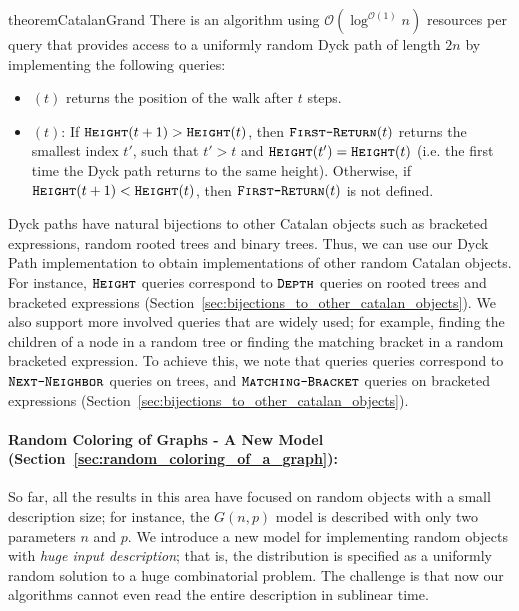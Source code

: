 \begin{restatable}{theorem}{CatalanGrand}
\label{thm:catalan_main}
There is an algorithm using $\mathcal O(\log^{\mathcal O(1)} n)$ resources per query that provides access to
a uniformly random Dyck path of length $2n$ by implementing the following queries:
\begin{itemize}
    \item {}$(t)$ returns the position of the walk after $t$ steps.
    \item {}$(t)$: If $\texttt{\textsc{Height}}(t+1) > \texttt{\textsc{Height}}(t)$, then $\texttt{\textsc{First-Return}}(t)$ returns the smallest index $t'$,
    such that $t'>t$ and $\texttt{\textsc{Height}}(t') = \texttt{\textsc{Height}}(t)$ (i.e. the first time the Dyck path returns to the same height).
    Otherwise, if $\texttt{\textsc{Height}}(t+1) < \texttt{\textsc{Height}}(t)$, then $\texttt{\textsc{First-Return}}(t)$ is not defined.
\end{itemize}
\end{restatable}

Dyck paths have natural bijections to other Catalan objects such as bracketed expressions, random rooted trees and binary trees.
Thus, we can use our Dyck Path implementation to obtain implementations of other random Catalan objects.
For instance, $\texttt{\textsc{Height}}$ queries correspond to $\texttt{\textsc{Depth}}$ queries on rooted trees and bracketed expressions
(Section~\ref{sec:bijections_to_other_catalan_objects}).
We also support more involved queries that are widely used; for example, finding the children of a node in a random tree
or finding the matching bracket in a random bracketed expression.
To achieve this, we note that  queries queries correspond to $\texttt{\textsc{Next-Neighbor}}$ queries on trees,
and $\texttt{\textsc{Matching-Bracket}}$ queries on bracketed expressions (Section~\ref{sec:bijections_to_other_catalan_objects}).



\paragraph*{Random Coloring of Graphs - A New Model (Section~\ref{sec:random_coloring_of_a_graph}):}%
\label{par:random_coloring_of_graphs}
So far, all the results in this area have focused on random objects with a small description size;
for instance, the $G(n, p)$ model is described with only two parameters $n$ and $p$.
We introduce a new model for implementing random objects with \emph{huge input description};
that is, the distribution is specified as a uniformly random solution to a huge combinatorial problem.
The challenge is that now our algorithms cannot even read the entire description in sublinear time.

